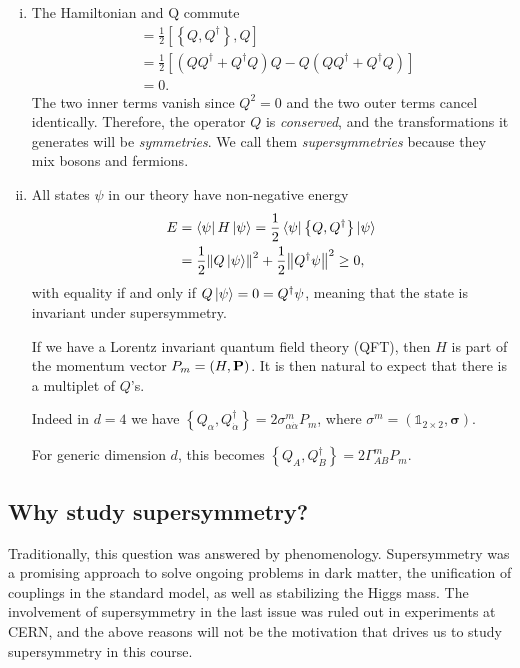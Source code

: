 \begin{enumerate}[i)]
  \item The Hamiltonian and Q commute
    \begin{align}
      [H, Q] &= \frac{1}{2} [\left\{ Q, Q^{\dagger} \right\}, Q]  \\
	     &= \frac{1}{2} [(Q Q^{\dagger} + Q^{\dagger} Q) Q - Q (Q Q^{\dagger} + Q^{\dagger} Q)] \\
	     &= 0.
    \end{align}
    The two inner terms vanish since $Q^2 = 0$ and the two outer terms cancel identically.
    Therefore, the operator $Q$ is \emph{conserved}, and the transformations it generates will be \emph{symmetries}. We call them \emph{supersymmetries} because they mix bosons and fermions.
  \item All states $\psi$ in our theory have non-negative energy
    \begin{align}
      E &= \bra{\psi} H \ket{\psi} = \frac{1}{2} \bra{\psi} \left\{ Q, Q^{\dagger} \right\} \ket{\psi} \\
      &= \frac{1}{2} \norm{Q \ket{\psi}}^2 + \frac{1}{2} \norm{Q^{\dagger} \psi}^2 \geq 0,
    \end{align}
    with equality if and only if $Q \ket{\psi} = 0 = Q^{\dagger} \psi$, meaning that the state is invariant under supersymmetry.

    If we have a Lorentz invariant quantum field theory (QFT), then $H$ is part of the momentum vector $P_m = (H, \vb{P})$. It is then natural to expect that there is a multiplet of $Q$'s.\par
    Indeed in $d = 4$ we have $\left\{ Q_{\alpha}, Q^{\dagger}_{\dot\alpha} \right\} = 2 \sigma^{m}_{\alpha \dot{\alpha}} P_m$, where $\sigma^{m} = (\mathbb{1}_{2 \times 2}, \boldsymbol\sigma)$.\par
    For generic dimension $d$, this becomes $\left\{ Q_A, Q_B^{\dagger} \right\} = 2 \Gamma^{m}_{AB} P_{m}$.
\end{enumerate}

\subsection*{Why study supersymmetry?}%

Traditionally, this question was answered by phenomenology. Supersymmetry was a promising approach to solve ongoing problems in dark matter, the unification of couplings in the standard model, as well as stabilizing the Higgs mass. The involvement of supersymmetry in the last issue was ruled out in experiments at CERN, and the above reasons will not be the motivation that drives us to study supersymmetry in this course.

